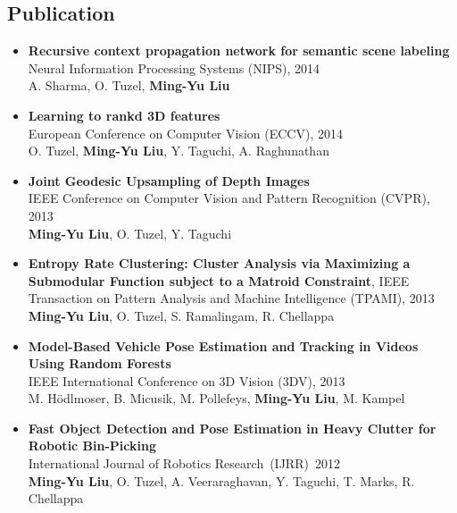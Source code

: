 \documentclass[10pt,letterpaper]{article}
\begin{document}
\subsection*{Publication}
\begin{itemize}
\item           {\bf Recursive context propagation network for semantic scene labeling}\\
                Neural Information Processing Systems (NIPS), 2014\\
                A. Sharma, O. Tuzel, {\bf Ming-Yu Liu}\vspace{-2mm}
                
\item           {\bf Learning to rankd 3D features}\\
                European Conference on Computer Vision (ECCV), 2014\\
                O. Tuzel, {\bf Ming-Yu Liu}, Y. Taguchi, A. Raghunathan\vspace{-2mm}
                
\item           {\bf Joint Geodesic Upsampling of Depth Images}\\
                IEEE Conference on Computer Vision and Pattern Recognition (CVPR), 2013\\
                {\bf Ming-Yu Liu}, O. Tuzel, Y. Taguchi\vspace{-2mm}
                
\item           {\bf Entropy Rate Clustering: Cluster Analysis via Maximizing a Submodular Function subject to a Matroid Constraint}, 
                IEEE Transaction on Pattern Analysis and Machine Intelligence (TPAMI), 2013\\
                {\bf Ming-Yu Liu}, O. Tuzel, S. Ramalingam, R. Chellappa\vspace{-2mm}
                
\item           {\bf Model-Based Vehicle Pose Estimation and Tracking in Videos Using Random Forests}\\
                IEEE International Conference on 3D Vision (3DV), 2013\\
                M. Hödlmoser, B. Micusik, M. Pollefeys, {\bf Ming-Yu Liu}, M. Kampel\vspace{-2mm}          
                
\item           {\bf Fast Object Detection and Pose Estimation in Heavy Clutter for Robotic Bin-Picking}\\
                International Journal of Robotics Research~(IJRR)~2012\\
                {\bf Ming-Yu Liu}, O. Tuzel, A. Veeraraghavan, Y. Taguchi, T. Marks, R. Chellappa\vspace{-2mm}
                

\end{itemize}
\end{document}

